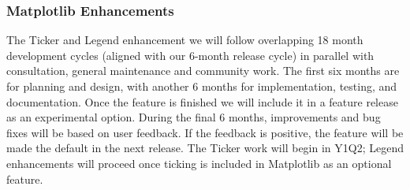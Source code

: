 \documentclass[12pt]{article}
\numberwithin{page}{section}
\begin{document}
\subsubsection{Matplotlib Enhancements}

The Ticker and Legend enhancement we will follow overlapping 18
month development cycles (aligned with our 6-month release cycle)
in parallel with consultation, general maintenance and
community work.  The first six months are for planning and design, with another
6 months for implementation, testing, and documentation.  Once the feature
is finished we will include it in a feature release as an experimental option.
During the final 6 months, improvements and bug fixes will be based on user feedback.
If the feedback is positive, the
feature will be made the default in the next release. The Ticker work will
begin in Y1Q2; Legend enhancements will proceed once ticking is included in Matplotlib as an
optional feature.


\end{document}
